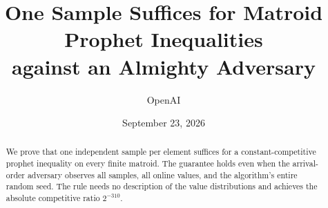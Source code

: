 \documentclass[11pt]{article}
\title{One Sample Suffices for Matroid Prophet Inequalities\\against an Almighty Adversary}
\author{OpenAI}
\date{September 23, 2026}
\numberwithin{equation}{section}
\theoremstyle{definition}
\begin{document}
\maketitle
\begin{abstract}
We prove that one independent sample per element suffices for a constant-competitive prophet inequality on every finite matroid. The guarantee holds even when the arrival-order adversary observes all samples, all online values, and the algorithm's entire random seed. The rule needs no description of the value distributions and achieves the absolute competitive ratio $2^{-310}$.
\end{abstract}









\end{document}
